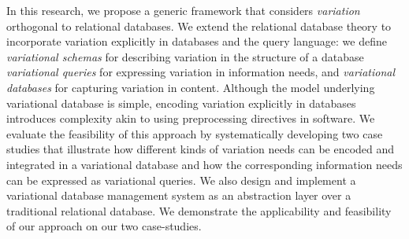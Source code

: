 \documentclass[11pt]{article}
\begin{document}
%
%
%
%
In this research, we propose a generic framework that considers
\emph{variation} orthogonal to relational databases. 
We extend the relational database theory to incorporate variation
explicitly in databases and the query language:
we define \emph{variational schemas} for describing variation in the structure of a database
\emph{variational queries} for expressing variation in information needs, 
and \emph{variational databases} for capturing variation in content. 
%
Although the model underlying variational database is simple, encoding variation
explicitly in databases introduces complexity akin to using preprocessing
directives in software. 
We evaluate the feasibility of this approach by systematically developing two case studies
that illustrate how different kinds of variation needs can be encoded and
integrated in a variational database and how the
corresponding information needs can be expressed as variational queries.
%
We also design and implement a variational database management system as an abstraction layer over a traditional relational database. We demonstrate the applicability and feasibility of our approach on our two case-studies.











\newpage

%


\appendix
\end{document}
